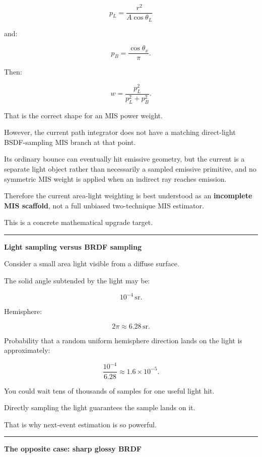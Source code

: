 \[
p_L
=
\frac{r^2}
{A\cos\theta_L}
\]

and:

\[
p_B=
\frac{\cos\theta_x}{\pi}.
\]

Then:

\[
w=
\frac{p_L^2}{p_L^2+p_B^2}.
\]

That is the correct shape for an MIS power weight.

However, the current path integrator does not have a matching direct-light BSDF-sampling MIS branch at that point.

Its ordinary bounce can eventually hit emissive geometry, but the current  is a separate light object rather than necessarily a sampled emissive primitive, and no symmetric MIS weight is applied when an indirect ray reaches emission.

Therefore the current area-light weighting is best understood as an \textbf{incomplete MIS scaffold}, not a full unbiased two-technique MIS estimator.

This is a concrete mathematical upgrade target.

\begin{center}\rule{0.5\linewidth}{0.5pt}\end{center}

\textbf{Light sampling versus BRDF sampling}

Consider a small area light visible from a diffuse surface.

The solid angle subtended by the light may be:

\[
10^{-4}\,\text{sr}.
\]

Hemisphere:

\[
2\pi\approx6.28\,\text{sr}.
\]

Probability that a random uniform hemisphere direction lands on the light is approximately:

\[
\frac{10^{-4}}{6.28}
\approx1.6\times10^{-5}.
\]

You could wait tens of thousands of samples for one useful light hit.

Directly sampling the light guarantees the sample lands on it.

That is why next-event estimation is so powerful.

\begin{center}\rule{0.5\linewidth}{0.5pt}\end{center}

\textbf{The opposite case: sharp glossy BRDF}

